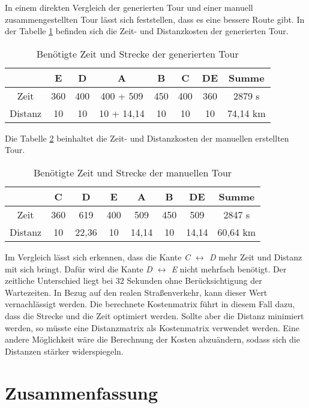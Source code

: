 \noindent
In einem direkten Vergleich der generierten Tour und einer manuell zusammengestellten Tour lässt sich feststellen, dass es eine bessere Route gibt. 
In der Tabelle \ref{tab:genTour} befinden sich die Zeit- und Distanzkosten der generierten Tour. 
\begin{table}[htb]%
\centering
\begin{tabular}{c|c|c|c|c|c|c|c}
 & E & D & A & B & C & DE & Summe\\ 
\hline 
Zeit & 360 & 400 & 400 + 509 & 450 & 400 & 360 & 2879 s \\
Distanz & 10 & 10 & 10 + 14,14 & 10 & 10 & 10 & 74,14 km \\
\end{tabular} 
\caption{Benötigte Zeit und Strecke der generierten Tour}
\label{tab:genTour}
\end{table}
Die Tabelle \ref{tab:manTour} beinhaltet die Zeit- und Distanzkosten der manuellen erstellten Tour.
\begin{table}[htb]%
\centering
\begin{tabular}{c|c|c|c|c|c|c|c}
 & C & D & E & A & B & DE & Summe\\ 
\hline 
Zeit & 360 & 619 & 400 & 509 & 450 & 509 & 2847 s \\
Distanz & 10 & 22,36 & 10 & 14,14 & 10 & 14,14 & 60,64 km \\
\end{tabular} 
\caption{Benötigte Zeit und Strecke der manuellen Tour}
\label{tab:manTour}
\end{table}
Im Vergleich lässt sich erkennen, dass die Kante \textit{C $\leftrightarrow$ D} mehr Zeit und Distanz mit sich bringt. 
Dafür wird die Kante \textit{D $\leftrightarrow$ E} nicht mehrfach benötigt. 
Der zeitliche Unterschied liegt bei $32$ Sekunden ohne Berücksichtigung der Wartezeiten. 
In Bezug auf den realen Straßenverkehr, kann dieser Wert vernachlässigt werden. 
Die berechnete Kostenmatrix führt in diesem Fall dazu, dass die Strecke und die Zeit optimiert werden. 
Sollte aber die Distanz minimiert werden, so müsste eine Distanzmatrix als Kostenmatrix verwendet werden. 
Eine andere Möglichkeit wäre die Berechnung der Kosten abzuändern, sodass sich die Distanzen stärker widerspiegeln. 

\chapter{Zusammenfassung}
\label{Zusammenfassung}

